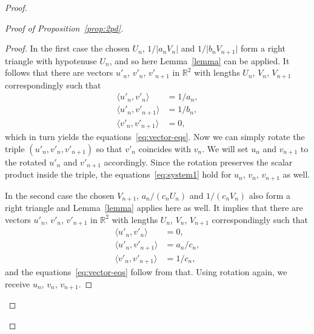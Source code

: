 \begin{proof}
\begin{proof}[Proof of Proposition~\ref{prop:2pd}]
\begin{proof}
          In the first case the chosen $U_n$, $1/\lvert a_n V_n \rvert$ and $1/\lvert b_n  V_{n+1}\rvert$
              form a right triangle with hypotenuse $U_n$, and so here Lemma~\ref{lemma} can be applied.
          It follows that there are vectors $u'_n$, $v'_n$, $v'_{n+1}$ in $\mathbb{R}^2$ with lengths $U_n$, $V_n$, $V_{n+1}$ correspondingly such that
          \begin{equation}
            \label{eq:system1}
            \begin{aligned}
              \langle u'_n, v'_n \rangle &= 1/a_n,\\
              \langle u'_n, v'_{n+1} \rangle &= 1/b_n,\\
              \langle v'_n, v'_{n+1} \rangle &= 0,
            \end{aligned}
          \end{equation}
          which in turn yields the equations~\eqref{eq:vector-eqs}.
          Now we can simply rotate the triple $(u'_n, v'_n, v'_{n+1})$ so that $v'_n$ coincides with $v_n$.
          We will set $u_n$ and $v_{n+1}$ to the rotated $u'_n$ and $v'_{n+1}$ accordingly.
          Since the rotation preserves the scalar product inside the triple, the equations~\eqref{eq:system1} hold for $u_n$, $v_n$, $v_{n+1}$ as well.

          In the second case the chosen $V_{n+1}$, $a_n/(c_n U_n)$ and $1/(c_n V_n)$ also form a right triangle and Lemma~\ref{lemma} applies here
            as well.
          It implies that there are vectors $u'_n$, $v'_n$, $v'_{n+1}$ in $\mathbb{R}^2$ with lengths $U_n$, $V_n$, $V_{n+1}$ correspondingly such that
          \begin{equation}
            \begin{aligned}
              \langle u'_n, v'_n \rangle &= 0,\\
              \langle u'_n, v'_{n+1} \rangle &= a_n/c_n,\\
              \langle v'_n, v'_{n+1} \rangle &= 1/c_n,
            \end{aligned}
          \end{equation}
          and the equations~\eqref{eq:vector-eqs} follow from that.
          Using rotation again, we receive $u_n$, $v_n$, $v_{n+1}$.


\end{proof}
\end{proof}
\end{proof}
